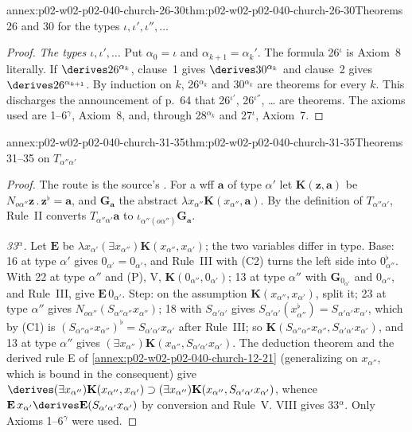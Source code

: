 \begin{annexitem}{annex:p02-w02-p02-040-church-26-30}{thm:p02-w02-p02-040-church-26-30}{Theorems 26 and 30 for the types \(\iota,\iota',\iota'',\ldots\)}
\begin{proof}
\emph{The types \(\iota,\iota',\ldots\)}  Put \(\alpha_0=\iota\) and
\(\alpha_{k+1}=\alpha_k'\).  The formula 26\(^\iota\) is Axiom~8 literally.  If
\(\derives26^{\alpha_k}\), clause~1 gives \(\derives30^{\alpha_k}\) and clause~2
gives \(\derives26^{\alpha_{k+1}}\).  By induction on \(k\), 26\(^{\alpha_k}\) and
30\(^{\alpha_k}\) are theorems for every \(k\).  This discharges the
announcement of p.~64 that 26\(^{\iota'}\), 26\(^{\iota''}\), \ldots{} are
theorems.  The axioms used are 1--6\(^\gamma\), Axiom~8, and, through
28\(^{\alpha_k}\) and 27\(^\iota\), Axiom~7.
\end{proof}
\end{annexitem}

\begin{annexitem}{annex:p02-w02-p02-040-church-31-35}{thm:p02-w02-p02-040-church-31-35}{Theorems 31--35 on \(T_{\alpha''\alpha'}\)}
\begin{proof}
The route is the source's \cite[\S7, pp.~67--68]{Church1940}.  For a wff
\(\mathbf a\) of type \(\alpha'\) let \(\mathbf K(\mathbf z,\mathbf a)\) be
\(N_{o\alpha''}\mathbf z\,.\,\mathbf z^\flat=\mathbf a\), and
\(\mathbf G_{\mathbf a}\) the abstract \(\lambda x_{\alpha''}\mathbf K(x_{\alpha''},\mathbf a)\).
By the definition of \(T_{\alpha''\alpha'}\), Rule~II converts
\(T_{\alpha''\alpha'}\mathbf a\) to \(\iota_{\alpha''(o\alpha'')}\mathbf G_{\mathbf a}\).

\emph{33\(^\alpha\).}  Let \(\mathbf E\) be
\(\lambda x_{\alpha'}(\exists x_{\alpha''})\mathbf K(x_{\alpha''},x_{\alpha'})\);
the two variables differ in type.  Base: 16 at type \(\alpha'\) gives
\(0_{\alpha'}=0_{\alpha'}\), and Rule~III with (C2) turns the left side into
\(0_{\alpha''}^\flat\).  With 22 at type \(\alpha''\) and (P), V,
\(\mathbf K(0_{\alpha''},0_{\alpha'})\); 13 at type \(\alpha''\) with
\(\mathbf G_{0_{\alpha'}}\) and \(0_{\alpha''}\), and Rule~III, give
\(\mathbf E\,0_{\alpha'}\).  Step: on the assumption
\(\mathbf K(x_{\alpha''},x_{\alpha'})\), split it; 23 at type \(\alpha''\) gives
\(N_{o\alpha''}(S_{\alpha''\alpha''}x_{\alpha''})\); 18 with \(S_{\alpha'\alpha'}\)
gives \(S_{\alpha'\alpha'}(x_{\alpha''}^\flat)=S_{\alpha'\alpha'}x_{\alpha'}\), which
by (C1) is \((S_{\alpha''\alpha''}x_{\alpha''})^\flat=S_{\alpha'\alpha'}x_{\alpha'}\)
after Rule~III; so \(\mathbf K(S_{\alpha''\alpha''}x_{\alpha''},S_{\alpha'\alpha'}x_{\alpha'})\),
and 13 at type \(\alpha''\) gives
\((\exists x_{\alpha''})\mathbf K(x_{\alpha''},S_{\alpha'\alpha'}x_{\alpha'})\).
The deduction theorem and the derived rule E of
\cref{annex:p02-w02-p02-040-church-12-21} (generalizing on \(x_{\alpha''}\),
which is bound in the consequent) give
\(\derives(\exists x_{\alpha''})\mathbf K(x_{\alpha''},x_{\alpha'})\supset
(\exists x_{\alpha''})\mathbf K(x_{\alpha''},S_{\alpha'\alpha'}x_{\alpha'})\), whence
\(\mathbf E\,x_{\alpha'}\derives\mathbf E(S_{\alpha'\alpha'}x_{\alpha'})\) by
conversion and Rule~V.  VIII gives 33\(^\alpha\).  Only Axioms
1--6\(^\gamma\) were used.


\end{proof}
\end{annexitem}
